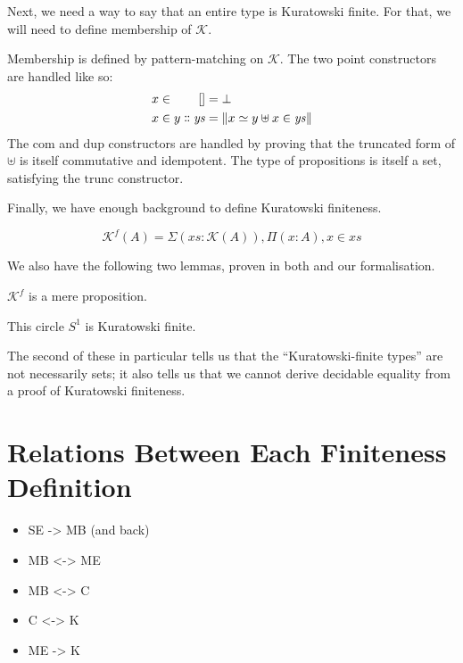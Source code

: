 Next, we need a way to say that an entire type is Kuratowski finite.
For that, we will need to define membership of \(\mathcal{K}\).
\begin{romdefinition}
  Membership is defined by pattern-matching on \(\mathcal{K}\).
  The two point constructors are handled like so:
  \begin{equation}
    \begin{alignedat}{2}
      x \in&& \; []                      &= \bot \\
      x \in&& \; y \dblcolon \mathit{ys} &= \lVert x \simeq y \uplus x \in \mathit{ys} \rVert
    \end{alignedat}
  \end{equation}
  The \(\text{com}\) and \(\text{dup}\) constructors are handled by proving that
  the truncated form of \(\uplus\) is itself commutative and idempotent.
  The type of propositions is itself a set, satisfying the \(\text{trunc}\)
  constructor.
\end{romdefinition}
Finally, we have enough background to define Kuratowski finiteness.
\begin{romdefinition}
  \begin{equation}
    \mathcal{K}^{f}(A) = \Sigma {(\mathit{xs} : \mathcal{K}(A))} , \Pi (x : A) , x \in \mathit{xs}
  \end{equation}
\end{romdefinition}

We also have the following two lemmas, proven in both
\cite{fruminFiniteSetsHomotopy2018} and our formalisation.
\begin{romlemma}
  \(\mathcal{K}^f\) is a mere proposition.
\end{romlemma}
\begin{romlemma}
  This circle \(S^1\) is Kuratowski finite.
\end{romlemma}
The second of these in particular tells us that the ``Kuratowski-finite types''
are not necessarily sets; it also tells us that we cannot derive decidable
equality from a proof of Kuratowski finiteness.
\section{Relations Between Each Finiteness Definition}
\begin{itemize}
  \item SE -> MB (and back)
  \item MB <-> ME
  \item MB <-> C
  \item C <-> K
  \item ME -> K
\end{itemize}
